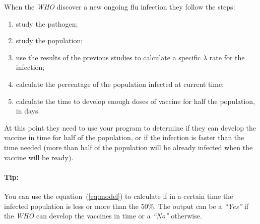 When the \emph{WHO} discover a new ongoing flu infection they follow the steps:
\begin{enumerate}
\item study the pathogen;
\item study the population;
\item use the results of the previous studies to calculate a specific
  $\lambda$ rate for the infection;
\item calculate the percentage of the population infected at current time;
\item calculate the time to develop enough doses of vaccine for half
  the population, in days.
\end{enumerate}
At this point they need to use your program to determine if they
can develop the vaccine in time for half of the population, or if the
infection is faster than the time needed (more than half of the
population will be already infected when the vaccine will be ready).

\paragraph{Tip:}
You can use the equation~(\ref{eq:model}) to calculate if in a
certain time the infected population is less or more than the 50\%.
The output can be a \emph{``Yes''} if the \emph{WHO} can
develop the vaccines in time or a \emph{``No''} otherwise. 


